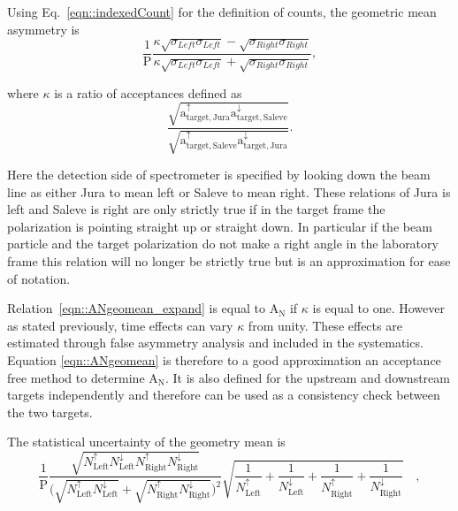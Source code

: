 Using Eq.~\ref{eqn::indexedCount} for the definition of counts, the geometric
mean asymmetry is
\begin{equation}
  \label{eqn::ANgeomean_expand}
\frac{1}{\mathrm{P}}\frac{\kappa \sqrt{\sigma_{Left}\sigma_{Left}} -
  \sqrt{\sigma_{Right}\sigma_{Right}}}{\kappa \sqrt{\sigma_{Left}\sigma_{Left}}
  + \sqrt{\sigma_{Right}\sigma_{Right}}},
\end{equation}

\noindent
where $\kappa$ is a ratio of acceptances defined as
\begin{equation}
\frac{\sqrt{\mathrm{a}^{\uparrow}_{\mathrm{target,Jura}}
    \mathrm{a}^{\downarrow}_{\mathrm{target,Saleve}}}}
     {\sqrt{\mathrm{a}^{\uparrow}_{\mathrm{target,Saleve}}
         \mathrm{a}^{\downarrow}_{\mathrm{target,Jura}}}}.
\end{equation}

\noindent
Here the detection side of spectrometer is specified by looking down the beam
line as either Jura to mean left or Saleve to mean right.  These relations of
Jura is left and Saleve is right are only strictly true if in the target frame
the polarization is pointing straight up or straight down.  In particular if the
beam particle and the target polarization do not make a right angle in the
laboratory frame this relation will no longer be strictly true but is an
approximation for ease of notation.

Relation~\ref{eqn::ANgeomean_expand} is equal to A$_{\mathrm{N}}$ if $\kappa$ is
equal to one.  However as stated previously, time effects can vary $\kappa$ from
unity. These effects are estimated through false asymmetry analysis and included
in the systematics.  Equation \ref{eqn::ANgeomean} is therefore to a good
approximation an acceptance free method to determine A$_{\mathrm{N}}$.  It is
also defined for the upstream and downstream targets independently and therefore
can be used as a consistency check between the two targets.

The statistical uncertainty of the geometry mean is
\begin{equation}
  \frac{1}{\mathrm{P}}
  \frac{
    \sqrt{
      N_{\mathrm{Left}}^{\uparrow}N_{\mathrm{Left}}^{\downarrow}
      N_{\mathrm{ Right}}^{\uparrow}N_{\mathrm{Right}}^{\downarrow}
    }
  }{
    \Big( \sqrt{N_{\mathrm{Left}}^{\uparrow}N_{\mathrm{Left}}^{\downarrow}} +
    \sqrt{N_{\mathrm{Right}}^{\uparrow}N_{\mathrm{Right}}^{\downarrow}} \Big)^2
  }
  \sqrt{
    \frac{1}{N_{\mathrm{Left}}^{\uparrow}} +
    \frac{1}{N_{\mathrm{Left}}^{\downarrow}} +
    \frac{1}{N_{\mathrm{Right}}^{\uparrow}} +
    \frac{1}{N_{\mathrm{Right}}^{\downarrow}}
  } \quad,
\end{equation}

